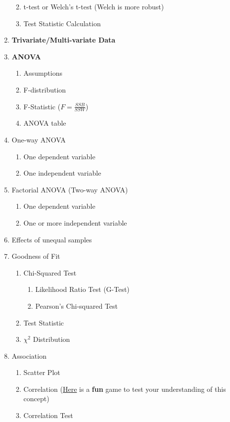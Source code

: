 \documentclass[11pt]{article}
\begin{document}
\begin{enumerate}
\begin{enumerate}
\begin{enumerate}
			\end{enumerate}
			\item t-test or Welch's t-test (Welch is more robust)
			\item Test Statistic Calculation
		\end{enumerate}
		\item \textbf{Trivariate/Multi-variate Data}
		\item \textbf{ANOVA}
		\begin{enumerate}
			\item Assumptions
			\item F-distribution
			\item F-Statistic ($F = \frac{SSB}{SSW}$)
			\item ANOVA table
		\end{enumerate}
		\item One-way ANOVA
		\begin{enumerate}
			\item One dependent variable
			\item One independent variable
		\end{enumerate}
		\item Factorial ANOVA (Two-way ANOVA)
		\begin{enumerate}
			\item One dependent variable
			\item One or more independent variable
		\end{enumerate}
		\item Effects of unequal samples
		\item Goodness of Fit
		\begin{enumerate}
			\item Chi-Squared Test
			\begin{enumerate}
				\item Likelihood Ratio Test (G-Test)
				\item Pearson's Chi-squared Test
			\end{enumerate}
			\item Test Statistic
			\item $\chi^2$ Distribution
		\end{enumerate}
		\item Association
		\begin{enumerate}
			\item Scatter Plot
			\item Correlation (\href{http://guessthecorrelation.com/}{Here} is a \textbf{fun} game to test your understanding of this concept)
			\item Correlation Test

\end{enumerate}
\end{enumerate}
\end{document}
